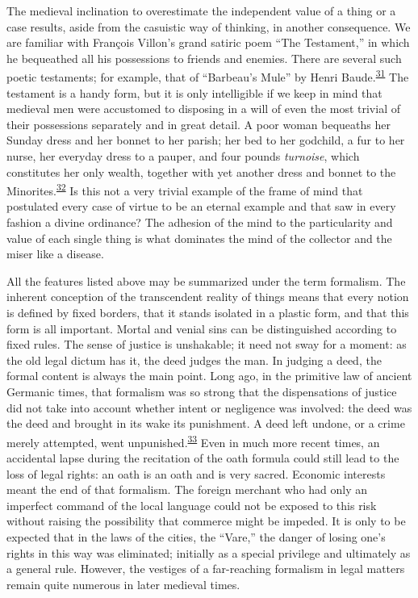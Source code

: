 The medieval inclination to overestimate the independent value of a
thing or a case results, aside from the casuistic way of thinking, in
another consequence. We are familiar with François Villon's grand
satiric poem ``The Testament,'' in which he bequeathed all his
possessions to friends and enemies. There are several such poetic
testaments; for example, that of ``Barbeau's Mule'' by Henri
Baude.\textsuperscript{\protect\hypertarget{18_Chapter_Eleven__THE_FORMS_OF_THO.xhtmlux5cux23id_571}{\protect\hyperlink{23_NOTES.xhtmlux5cux23id_572}{31}}}
The testament is a handy form, but it is only intelligible if we keep in
mind that medieval men were accustomed to disposing in a will of even
the most trivial of their possessions separately and in great detail. A
poor woman bequeaths her Sunday dress and her bonnet to her parish; her
bed to her godchild, a fur to her nurse, her everyday dress to a pauper,
and four pounds \emph{turnoise}, which constitutes her only wealth,
together with yet another dress and bonnet to the
Minorites.\textsuperscript{\protect\hypertarget{18_Chapter_Eleven__THE_FORMS_OF_THO.xhtmlux5cux23id_569}{\protect\hyperlink{23_NOTES.xhtmlux5cux23id_570}{32}}}
Is this not a very trivial example of the frame of mind that postulated
every case of virtue to be an eternal example and that saw in every
fashion a divine ordinance? The adhesion of the mind to the
particularity and value of each single thing is what dominates the mind
of the collector and the miser like a disease.

All the features listed above may be summarized under the term
formalism. The inherent conception of the transcendent reality of
\protect\hypertarget{18_Chapter_Eleven__THE_FORMS_OF_THO.xhtmlux5cux23page_279}{}{}things
means that every notion is defined by fixed borders, that it stands
isolated in a plastic form, and that this form is all important. Mortal
and venial sins can be distinguished according to fixed rules. The sense
of justice is unshakable; it need not sway for a moment: as the old
legal dictum has it, the deed judges the man. In judging a deed, the
formal content is always the main point. Long ago, in the primitive law
of ancient Germanic times, that formalism was so strong that the
dispensations of justice did not take into account whether intent or
negligence was involved: the deed was the deed and brought in its wake
its punishment. A deed left undone, or a crime merely attempted, went
unpunished.\textsuperscript{\protect\hypertarget{18_Chapter_Eleven__THE_FORMS_OF_THO.xhtmlux5cux23id_567}{\protect\hyperlink{23_NOTES.xhtmlux5cux23id_568}{33}}}
Even in much more recent times, an accidental lapse during the
recitation of the oath formula could still lead to the loss of legal
rights: an oath is an oath and is very sacred. Economic interests meant
the end of that formalism. The foreign merchant who had only an
imperfect command of the local language could not be exposed to this
risk without raising the possibility that commerce might be impeded. It
is only to be expected that in the laws of the cities, the ``Vare,'' the
danger of losing one's rights in this way was eliminated; initially as a
special privilege and ultimately as a general rule. However, the
vestiges of a far-reaching formalism in legal matters remain quite
numerous in later medieval times.

